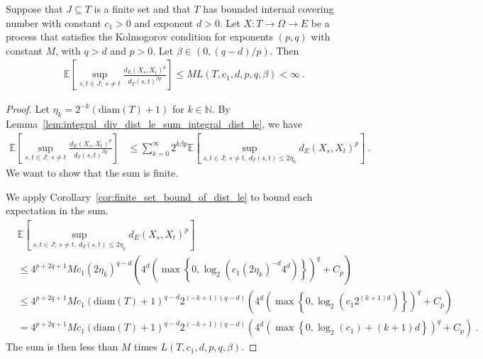 \begin{lemma}\label{lem:finite_set_bound}
  \leanok
Suppose that $J \subseteq T$ is a finite set and that $T$ has bounded internal covering number with constant $c_1>0$ and exponent $d > 0$.
Let $X : T \to \Omega \to E$ be a process that satisfies the Kolmogorov condition for exponents $(p,q)$ with constant $M$, with $q > d$ and $p > 0$.
Let $\beta \in(0, (q - d)/p)$.
Then
\begin{align*}
  \mathbb{E}\left[ \sup_{s, t \in J;\: s \ne t} \frac{d_E(X_s, X_t)^p}{d_T(s, t)^{\beta p}} \right]
  \le M L(T, c_1, d, p, q, \beta)
  < \infty
  \: .
\end{align*}
\end{lemma}

\begin{proof}
Let $\eta_k = 2^{-k}(\mathrm{diam}(T) + 1)$ for $k \in \mathbb{N}$.
By Lemma~\ref{lem:integral_div_dist_le_sum_integral_dist_le}, we have
\begin{align*}
  \mathbb{E}\left[ \sup_{s, t \in J;\: s \ne t} \frac{d_E(X_s, X_t)^p}{d_T(s, t)^{\beta p}} \right]
  &\le \sum_{k=0}^\infty 2^{k \beta p} \mathbb{E}\left[ \sup_{s, t \in J;\: s \ne t, \: d_T(s, t) \le 2 \eta_k} d_E(X_s, X_t)^p \right]
  \: .
\end{align*}
We want to show that the sum is finite.

We apply Corollary~\ref{cor:finite_set_bound_of_dist_le} to bound each expectation in the sum.
\begin{align*}
  &\mathbb{E}\left[ \sup_{s, t \in J;\: s \ne t, \: d_T(s, t) \le 2 \eta_k} d_E(X_s, X_t)^p \right]
  \\
  &\le 4^{p+2q+1} M c_1 (2 \eta_k)^{q-d} \left(4^d \left(\max\left\{0, \log_2 \left(c_1 (2 \eta_k)^{-d} 4^d \right) \right\} \right)^q
    + C_p\right)
  \\
  &\le 4^{p+2q+1} M c_1 (\mathrm{diam}(T)+1)^{q-d} 2^{(-k + 1)(q-d)} \left(4^d \left(\max\left\{0, \log_2 \left(c_1 2^{(k + 1)d} \right) \right\} \right)^q
    + C_p\right)
  \\
  &= 4^{p+2q+1} M c_1 (\mathrm{diam}(T)+1)^{q-d} 2^{(-k + 1)(q-d)} \left(4^d \left(\max\left\{0, \log_2(c_1) + (k + 1)d \right\} \right)^q
    + C_p\right)
  \: .
\end{align*}
The sum is then less than $M$ times $L(T, c_1, d, p, q, \beta)$.
\end{proof}


